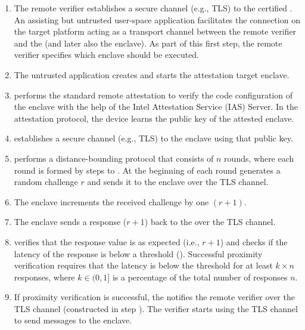 \begin{enumerate}
  \item[\one] The remote verifier establishes a secure channel (e.g., TLS) to the certified \devicepm. An assisting but untrusted user-space application facilitates the connection on the target platform acting as a transport channel between the remote verifier and the \devicepm (and later also the enclave). As part of this first step, the remote verifier specifies which enclave should be executed.

  \item[\two] The untrusted application creates and starts the attestation target enclave.

  \item[\three] \devicepm performs the standard remote attestation to verify the code configuration of the enclave with the help of the Intel Attestation Service (IAS) Server. In the attestation protocol, the device learns the public key of the attested enclave.

  \item[\four] \devicepm establishes a secure channel (e.g., TLS) to the enclave using that public key.

  \item[\five] \devicepm performs a distance-bounding protocol that consists of $n$ rounds, where each round is formed by steps \five to \eight.
  At the beginning of each round \devicepm generates a random challenge $r$ and sends it to the enclave over the TLS channel.

  \item[\six] The enclave increments the received challenge by one $(r+1)$.

  \item[\seven] The enclave sends a response ($r+1$) back to the \devicepm over the TLS channel.

  \item[\eight] \devicepm verifies that the response value is as expected (i.e., $r+1$) and checks if the latency of the response is below a threshold (\connect). Successful proximity verification requires that the latency is below the threshold for at least $k \times n$ responses, where $k \in (0, 1]$ is a percentage of the total number of responses $n$.

  \item[\nine] If proximity verification is successful, the \devicepm notifies the remote verifier over the TLS channel (constructed in step \one). The verifier starts using the \devicepm TLS channel to send messages to the enclave.
\end{enumerate}


